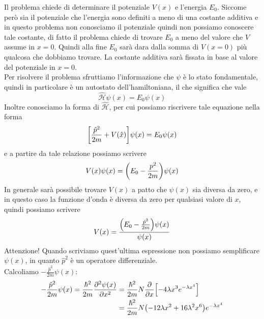 \begin{soluzione}
   Il problema chiede di determinare il potenziale $V(x)$ e l'energia $E_0$. Siccome però sia il potenziale che l'energia sono definiti a meno di una costante additiva e in questo problema non conosciamo il potenziale quindi non possiamo conoscere tale costante, di fatto il problema chiede di trovare $E_0$ a meno del valore che $V$ assume in $x=0$. Quindi alla fine $E_0$ sarà dara dalla somma di $V(x=0)$ più qualcosa che dobbiamo trovare. La costante additiva sarà fissata in base al valore del potenziale in $x=0$.\\
   Per risolvere il problema sfruttiamo l'informazione che $\psi$ è lo stato fondamentale, quindi in particolare è un autostato dell'hamiltoniana, il che significa che vale
   \begin{equation*}
      \hat{\mathcal{H}}\psi(x)
      =E_0 \psi(x)
   \end{equation*}
   Inoltre conosciamo la forma di $\hat{\mathcal{H}}$, per cui possiamo riscrivere tale equazione nella forma
   \begin{equation*}
      \qty[ \frac{\hat{p}^2}{2m} + V(\hat{x}) ] \psi(x)
      =E_0 \psi(x)
   \end{equation*}
   e a partire da tale relazione possiamo scrivere
   \begin{equation*}
      V(x)\psi(x)=\qty( E_0 - \frac{p^2}{2m} )\psi(x)
   \end{equation*}
   In generale sarà possibile trovare $V(x)$ a patto che $\psi(x)$ sia diversa da zero, e in questo caso la funzione d'onda è diversa da zero per qualsiasi valore di $x$, quindi possiamo scrivere
   \begin{equation*}
      V(x)=\frac{\qty( E_0 - \frac{\hat{p}^2}{2m} )\psi(x)}{\psi(x)}
   \end{equation*}
   Attenzione! Quando scriviamo quest'ultima espressione non possiamo semplificare $\psi(x)$, in quanto $\hat{p}^2$ è un operatore differenziale.\\
   Calcoliamo $-\frac{\hat{p}^2}{2m}\psi(x)$:
   \begin{equation*}
      \begin{split}
         -\frac{\hat{p}^2}{2m}\psi(x)
         =\frac{\hbar^2}{2m} \pdv[2]{\psi(x)}{x}
         & =\frac{\hbar^2}{2m} N \pdv{x} \qty[ -4\lambda x^3 e^{-\lambda x^4} ]
         \\
         & =\frac{\hbar^2}{2m} N \bigl( -12\lambda x^2 + 16\lambda^2 x^6 \bigr) e^{-\lambda x^4}
         \\

\end{split}
\end{equation*}
\end{soluzione}
